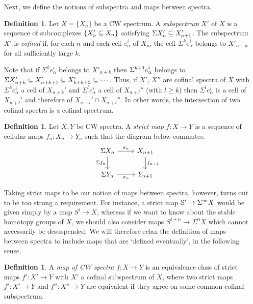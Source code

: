 \documentclass[11pt, titlepage]{article} %
\def\bb{\ensuremath\mathbb}
\def\subq{\ensuremath\subseteq}
\def\SIgma{\ensuremath\Sigma}
\numberwithin{equation}{subsection}
\theoremstyle{plain}
\theoremstyle{definition}
\newtheorem{definition}[theorem]{Definition}
\begin{document}
Next, we define the notions of subspectra and maps between spectra.

\begin{definition}
Let \(X=\{X_n\}\) be a CW spectrum. A \textit{subspectrum} \(X'\) of \(X\) is a sequence of subcomplexes \(\{X_n'\subq X_n\}\) satisfying \(\Sigma X_n'\subq X_{n+1}'\). The subspectrum \(X'\) is \textit{cofinal} if, for each \(n\) and each cell \(e^i_\alpha\) of \(X_n\), the cell \(\Sigma^k e_\alpha^i\) belongs to \(X'_{n+k}\) for all sufficiently large \(k\).
\end{definition}

Note that if \(\Sigma^ke^i_\alpha\) belongs to \(X'_{n+k}\) then \(\SIgma^{k+1}e^i_\alpha\) belongs to \(\Sigma X'_{n+k}\subq X'_{n+k+1}\subq X'_{k+k+2}\subq \cdots\). Thus, if \(X'\), \(X''\) are cofinal spectra of \(X\) with \(\Sigma^k e_{\alpha}^i\) a cell of \(X_{n+k}'\) and \(\Sigma^l e_\alpha^i\) a cell of \(X_{n+l}''\) (with \(l\geq k\)) then \(\Sigma^l e_\alpha^i\) is a cell of \(X_{n+l}'\) and therefore of \(X_{n+l}'\cap X_{n+l}''\). In other words, the intersection of two cofinal spectra is a cofinal spectrum.

\begin{definition}
Let \(X, Y\) be CW spectra. A \textit{strict map} \(f : X \to Y\) is a sequence of cellular maps \(f_n : X_n \to Y_n\) such that the diagram below commutes.
\[\begin{tikzcd}
\Sigma X_n \arrow[r, "\sigma_n"] \arrow[d, swap, "\Sigma f_n"]  & X_{n+1} \arrow[d, "f_{n+1}"]  \\
\SIgma Y_n \arrow[r, swap, "\sigma_n"]  & Y_{n+1}
\end{tikzcd}\]
\end{definition}

Taking strict maps to be our notion of maps between spectra, however, turns out to be too strong a requirement. For instance, a strict map \(\bb{S}^i \to \Sigma^\infty X\) would be given simply by a map \(S^i \to X\), whereas if we want to know about the stable homotopy groups of \(X\), we should also consider maps \(S^{i+n}\to \Sigma^n X\) which cannot necessarily be desuspended. We will therefore relax the definition of maps between spectra to include maps that are `defined eventually', in the following sense. 

\begin{definition}
A \textit{map of CW spectra} \(f : X \to Y\) is an equivalence class of strict maps \(f' : X' \to Y\) with \(X'\) a cofinal subspectrum of \(X\), where two strict maps \(f' : X' \to Y\) and \(f'' : X'' \to Y\) are equivalent if they agree on some common cofinal subspectrum. 
\end{definition}
\end{document}

